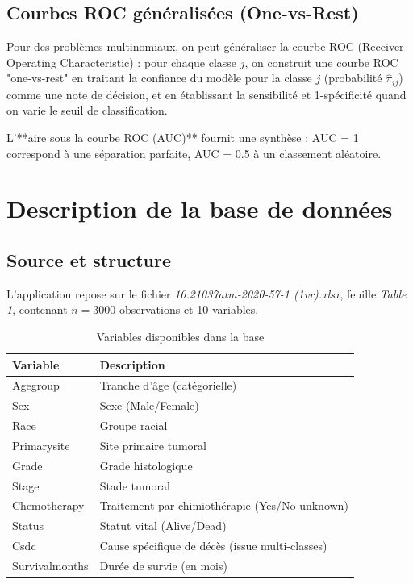 \documentclass[12pt,a4paper]{article}
\begin{document}
\begin{itemize}
\subsection{Courbes ROC généralisées (One-vs-Rest)}

Pour des problèmes multinomiaux, on peut généraliser la courbe ROC (Receiver Operating Characteristic) : pour chaque classe $j$, on construit une courbe ROC "one-vs-rest" en traitant la confiance du modèle pour la classe $j$ (probabilité $\widehat{\pi}_{ij}$) comme une note de décision, et en établissant la sensibilité et 1-spécificité quand on varie le seuil de classification.

L'**aire sous la courbe ROC (AUC)** fournit une synthèse : AUC = 1 correspond à une séparation parfaite, AUC = 0.5 à un classement aléatoire.

\section{Description de la base de données}
\subsection{Source et structure}
L'application repose sur le fichier \textit{10.21037atm-2020-57-1 (1vr).xlsx}, feuille \textit{Table 1}, contenant $n=3000$ observations et 10 variables.

\begin{table}[H]
\centering
\caption{Variables disponibles dans la base}
\begin{tabular}{p{4.1cm}p{8.9cm}}
\toprule
\textbf{Variable} & \textbf{Description} \\
\midrule
Agegroup & Tranche d'âge (catégorielle) \\
Sex & Sexe (Male/Female) \\
Race & Groupe racial \\
Primarysite & Site primaire tumoral \\
Grade & Grade histologique \\
Stage & Stade tumoral \\
Chemotherapy & Traitement par chimiothérapie (Yes/No-unknown) \\
Status & Statut vital (Alive/Dead) \\
Csdc & Cause spécifique de décès (issue multi-classes) \\
Survivalmonths & Durée de survie (en mois) \\
\bottomrule
\end{tabular}
\end{table}


\end{itemize}
\end{document}

